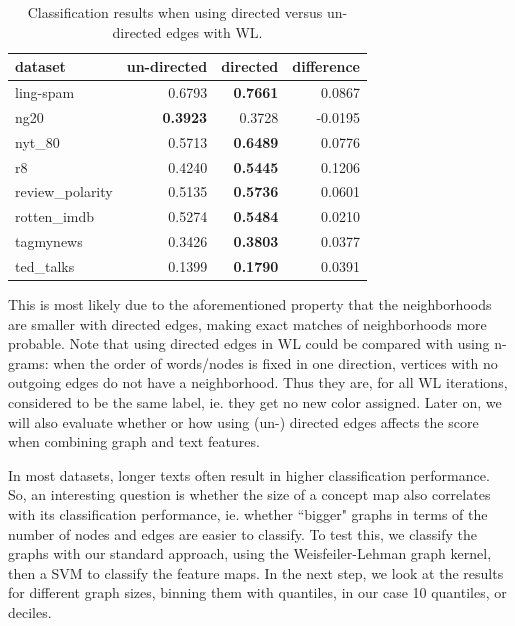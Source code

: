 \begin{table}[htb!]
	\centering
\begin{tabular}{lrrr}
	dataset &  un-directed & directed &  difference \\
	\midrule
	ling-spam       &  0.6793 &  \textbf{0.7661} &  0.0867 \\
	ng20            &  \textbf{0.3923} &  0.3728 & -0.0195 \\
	nyt\_80          &  0.5713 &  \textbf{0.6489} &  0.0776 \\
	r8              &  0.4240 &  \textbf{0.5445} &  0.1206 \\
	review\_polarity &  0.5135 & \textbf{ 0.5736 }&  0.0601 \\
	rotten\_imdb     &  0.5274 &  \textbf{0.5484} &  0.0210 \\
	tagmynews       &  0.3426 &  \textbf{0.3803} &  0.0377 \\
	ted\_talks       &  0.1399 &  \textbf{0.1790} &  0.0391 \\
	\bottomrule
\end{tabular}
\caption[Results: WL with directed and un-directed edges]{Classification results when using directed versus un-directed edges with WL.}\label{table:results_directed_vs_undirected}
\end{table}

This is most likely due to the aforementioned property that the neighborhoods are smaller with directed edges, making exact matches of neighborhoods more probable.
Note that using directed edges in WL could be compared with using n-grams: when the order of words/nodes is fixed in one direction, vertices with no outgoing edges do not have a neighborhood. Thus they are, for all WL iterations, considered to be the same label, ie. they get no new color assigned.
Later on, we will also evaluate whether or how using (un-) directed edges affects the score when combining graph and text features.


In most datasets, longer texts often result in higher classification performance.
So, an interesting question is whether the size of a concept map also correlates with its classification performance, ie. whether ``bigger" graphs in terms of the number of nodes and edges are easier to classify.
To test this, we classify the graphs with our standard approach, using the Weisfeiler-Lehman graph kernel, then a SVM to classify the feature maps.
In the next step, we look at the results for different graph sizes, binning them with quantiles, in our case 10 quantiles, or deciles.

